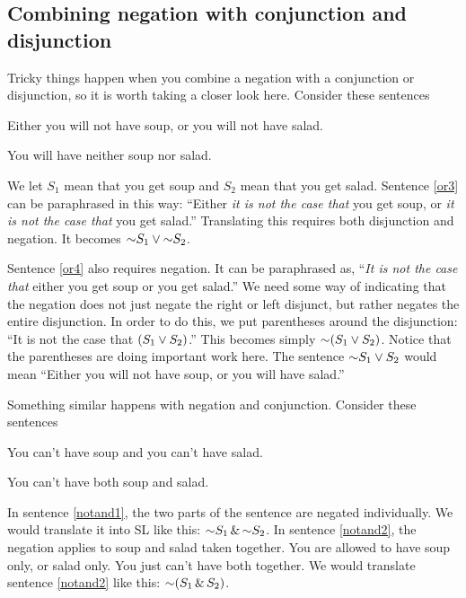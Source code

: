 \subsection{Combining negation with conjunction and disjunction}

Tricky things happen when you combine a negation with a conjunction or disjunction, so it is worth taking a closer look here. Consider these sentences

\begin{earg}
\item[\ex{or3}] Either you will not have soup, or you will not have salad.
\item[\ex{or4}] You will have neither soup nor salad.
\end{earg}

We let $S_1$ mean that you get soup and $S_2$ mean that you get salad. Sentence \ref{or3} can be paraphrased in this way: ``Either \emph{it is not the case that} you get soup, or \emph{it is not the case that} you get salad.'' Translating this requires both disjunction and negation. It becomes $\mathord{\sim} S_1 \vee \mathord{\sim} S_2$.

Sentence \ref{or4} also requires negation. It can be paraphrased as, ``\emph{It is not the case that} either you get soup or you get salad.'' We need some way of indicating that the negation does not just negate the right or left disjunct, but rather negates the entire disjunction. In order to do this, we put parentheses around the disjunction: ``It is not the case that $(S_1 \vee S_2)$.'' This becomes simply $\mathord{\sim} (S_1 \vee S_2)$. Notice that the parentheses are doing important work here. The sentence $\mathord{\sim} S_1 \vee S_2$ would mean ``Either you will not have soup, or you will have salad.''

Something similar happens with negation and conjunction. Consider these sentences

\begin{earg}
\item[\ex{notand1}] You can't have soup and you can't have salad.
\item[\ex{notand2}] You can't have both soup and salad. 
\end{earg}

In sentence \ref{notand1}, the two parts of the sentence are negated individually. We would translate it into SL like this: $\mathord{\sim} S_1 \,\&\, \mathord{\sim} S_2$. In sentence \ref{notand2}, the negation applies to soup and salad taken together. You are allowed to have soup only, or salad only. You just can't have both together. We would translate sentence \ref{notand2} like this: $\mathord{\sim}(S_1 \,\&\, S_2)$. 

